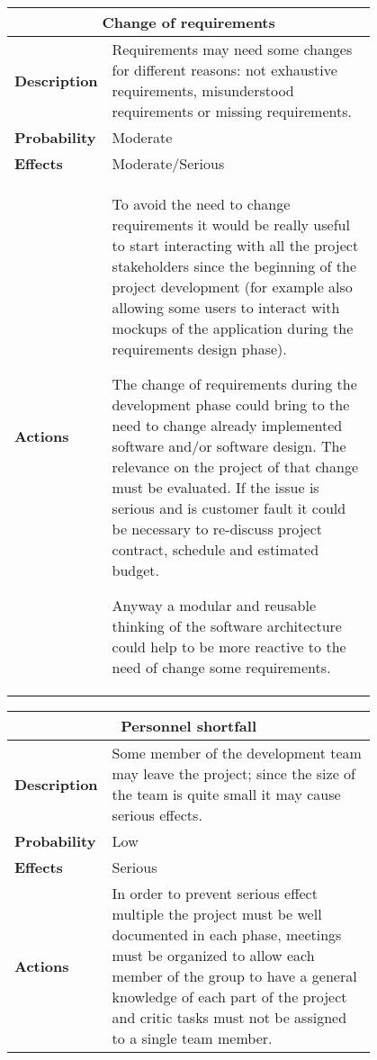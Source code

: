 \begin{longtable}{lp{0.8\linewidth}}
\multicolumn{2}{c}{\textbf{Change of requirements}}\\
\toprule
\textbf{Description}& Requirements may need some changes for different reasons: not exhaustive requirements, misunderstood requirements or missing requirements. \\
\midrule
\textbf{Probability}&Moderate\\
\midrule
\textbf{Effects}&Moderate/Serious\\
\midrule
\textbf{Actions}& To avoid the need to change requirements it would be really useful to start interacting with all the project stakeholders since the beginning of the project development (for example also allowing some users to interact with mockups of the application during the requirements design phase). 

The change of requirements during the development phase could bring to the need to change already implemented software and/or software design. The relevance on the project of that change must be evaluated. If the issue is serious and is customer fault it could be necessary to re-discuss project contract, schedule and estimated budget. 

Anyway a modular and reusable thinking of the software architecture could help to be more reactive to the need of change some requirements.\\
\bottomrule
\end{longtable}

\begin{longtable}{lp{0.8\linewidth}}
\multicolumn{2}{c}{\textbf{Personnel shortfall}}\\
\toprule
\textbf{Description}& Some member of the development team may leave the project; since the size of the team is quite small it may cause serious effects. \\
\midrule
\textbf{Probability}&Low\\
\midrule
\textbf{Effects}&Serious\\
\midrule
\textbf{Actions}& In order to prevent serious effect multiple the project must be well documented in each phase, meetings must be organized to allow each member of the group to have a general knowledge of each part of the project and critic tasks must not be assigned to a single team member.\\
\bottomrule
\end{longtable}


